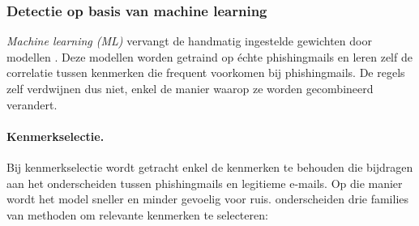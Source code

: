 \subsubsection{Detectie op basis van machine learning}
\label{subsubsec:machinelearning-detectie}

\emph{Machine learning (ML)} vervangt de handmatig ingestelde gewichten door modellen \autocite{Salloum2022}. Deze modellen worden getraind op échte phishingmails en leren zelf de correlatie tussen kenmerken die frequent voorkomen bij phishingmails. De regels zelf verdwijnen dus niet, enkel de manier waarop ze worden gecombineerd verandert.

\paragraph{Kenmerkselectie.}
Bij kenmerkselectie wordt getracht enkel de kenmerken te behouden die bijdragen aan het onderscheiden tussen phishingmails en legitieme e-mails. Op die manier wordt het model sneller en minder gevoelig voor ruis. \textcite{Guyon2003} onderscheiden drie families van methoden om relevante kenmerken te selecteren:

